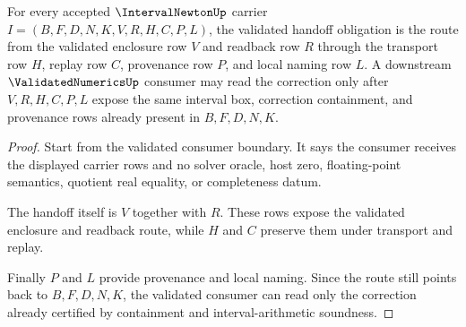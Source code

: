 \begin{theorem}
\label{thm:interval-newton-validated-handoff-obligation}
For every accepted $\IntervalNewtonUp$ carrier $I=(B,F,D,N,K,V,R,H,C,P,L)$, the validated handoff obligation is the route from the validated enclosure row $V$ and readback row $R$ through the transport row $H$, replay row $C$, provenance row $P$, and local naming row $L$. A downstream $\ValidatedNumericsUp$ consumer may read the correction only after $V,R,H,C,P,L$ expose the same interval box, correction containment, and provenance rows already present in $B,F,D,N,K$.
\end{theorem}
\begin{proof}
Start from the validated consumer boundary. It says the consumer receives the displayed carrier rows and no solver oracle, host zero, floating-point semantics, quotient real equality, or completeness datum.

The handoff itself is $V$ together with $R$. These rows expose the validated enclosure and readback route, while $H$ and $C$ preserve them under transport and replay.

Finally $P$ and $L$ provide provenance and local naming. Since the route still points back to $B,F,D,N,K$, the validated consumer can read only the correction already certified by containment and interval-arithmetic soundness.
\end{proof}

